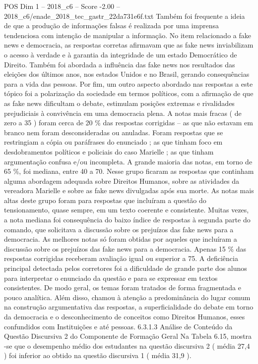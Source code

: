 \begin{textsample}{POS Dim 1 – 2018\_c6 – Score -2.00 – 2018\_c6/enade\_2018\_tec\_gastr\_22da731e6f.txt}
Também foi frequente a ideia de que a produção de informações falsas é realizada por uma imprensa tendenciosa com intenção de manipular a informação.
No item relacionado a fake news e democracia, as respostas corretas afirmavam que as fake news inviabilizam o acesso à verdade e à garantia da integridade de um estado Democrático de Direito.
Também foi abordada a influência das fake news nos resultados das eleições dos últimos anos, nos estados Unidos e no Brasil, gerando consequências para a vida das pessoas.
Por fim, um outro aspecto abordado nas respostas a este tópico foi a polarização da sociedade em termos políticos, com a afirmação de que as fake news dificultam o debate, estimulam posições extremas e rivalidades prejudiciais à convivência em uma democracia plena.
A notas mais fracas ( de zero a 35 ) foram cerca de 20 \% das respostas corrigidas – as que não estavam em branco nem foram desconsideradas ou anuladas.
Foram respostas que se restringiam a cópia ou paráfrases do enunciado ; as que tinham foco em desdobramentos políticos e policiais do caso Marielle ; as que tinham argumentação confusa e/ou incompleta.
A grande maioria das notas, em torno de 65 \%, foi mediana, entre 40 a 70.
Nesse grupo ficaram as respostas que continham alguma abordagem adequada sobre Direitos Humanos, sobre as atividades da vereadora Marielle e sobre as fake news divulgadas após sua morte.
As notas mais altas deste grupo foram para respostas que incluíram a questão do tensionamento, quase sempre, em um texto coerente e consistente.
Muitas vezes, a nota mediana foi consequência do baixo índice de respostas à segunda parte do comando, que solicitava a discussão sobre os prejuízos das fake news para a democracia.
As melhores notas só foram obtidas por aqueles que incluíram a discussão sobre os prejuízos das fake news para a democracia.
Apenas 15 \% das respostas corrigidas receberam avaliação igual ou superior a 75.
A deficiência principal detectada pelos corretores foi a dificuldade de grande parte dos alunos para interpretar o enunciado da questão e para se expressar em textos consistentes.
De modo geral, os temas foram tratados de forma fragmentada e pouco analítica.
Além disso, chamou à atenção a predominância do lugar comum na construção argumentativa das respostas, a superficialidade do debate em torno da democracia e o desconhecimento de conceitos como Direitos Humanos, esses confundidos com Instituições e até pessoas. 6.3.1.3 Análise de Conteúdo da Questão Discursiva 2 do Componente de Formação Geral Na Tabela 6.15, mostra -se que o desempenho médio dos estudantes na questão discursiva 2 ( média 27,4 ) foi inferior ao obtido na questão discursiva 1 ( média 31,9 ).

\end{textsample}
